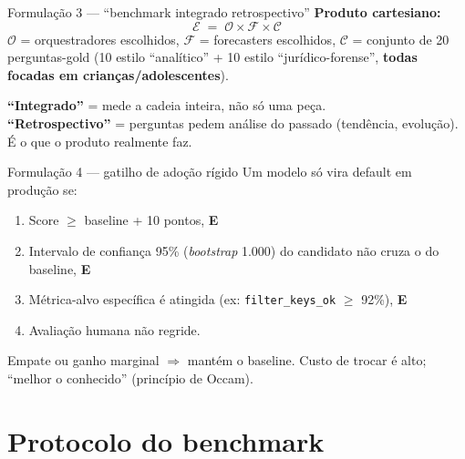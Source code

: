 \documentclass[10pt,aspectratio=169]{beamer}
\newcommand{\code}[1]{\texttt{\small #1}}
\begin{document}
\begin{frame}{Formulação 3 --- ``benchmark integrado retrospectivo''}
\textbf{Produto cartesiano:}
\[
\mathcal{E} \;=\; \mathcal{O} \times \mathcal{F} \times \mathcal{C}
\]
\small
$\mathcal{O}$ = orquestradores escolhidos, $\mathcal{F}$ = forecasters
escolhidos, $\mathcal{C}$ = conjunto de 20 perguntas-gold (10 estilo
``analítico'' + 10 estilo ``jurídico-forense'', \textbf{todas focadas
em crianças/adolescentes}).

\vspace{0.4em}
\normalsize
\textbf{``Integrado''} = mede a cadeia inteira, não só uma peça.\\
\textbf{``Retrospectivo''} = perguntas pedem análise do passado
(tendência, evolução). É o que o produto realmente faz.
\end{frame}

\begin{frame}{Formulação 4 --- gatilho de adoção rígido}
Um modelo só vira default em produção se:
\begin{enumerate}\small
\item Score $\ge$ baseline + 10 pontos, \textbf{E}
\item Intervalo de confiança 95\% (\emph{bootstrap} 1.000) do
candidato não cruza o do baseline, \textbf{E}
\item Métrica-alvo específica é atingida (ex: \code{filter\_keys\_ok}
$\ge$ 92\%), \textbf{E}
\item Avaliação humana não regride.
\end{enumerate}

\vspace{0.5em}
\alert{Empate ou ganho marginal $\Rightarrow$ mantém o baseline.
Custo de trocar é alto; ``melhor o conhecido'' (princípio de Occam).}
\end{frame}

\section{Protocolo do benchmark}
\end{document}
